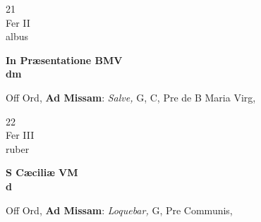 \documentclass[10pt, openany]{book}
\begin{document}
        \begin{center}
            \begin{minipage}{3.5in}
                \vspace{2em}
                \begin{minipage}{0.5in}
                    {\Huge 21} \\
                    {\normalsize Fer II} \\
                    {\normalsize albus}
                \end{minipage}
                \begin{minipage}{3.0in}
                    \textbf{ \large In Præsentatione BMV \\
                    \textnormal{\normalsize dm}} \\ 
                \end{minipage}
                \begin{justify}Off Ord, \textbf{Ad Missam}: \textit{Salve,} G, C, Pre de B Maria Virg,   
                \end{justify}
            \end{minipage}
        \end{center}
    
        \begin{center}
            \begin{minipage}{3.5in}
                \vspace{2em}
                \begin{minipage}{0.5in}
                    {\Huge 22} \\
                    {\normalsize Fer III} \\
                    {\normalsize ruber}
                \end{minipage}
                \begin{minipage}{3.0in}
                    \textbf{ \large S Cæciliæ VM \\
                    \textnormal{\normalsize d}} \\ 
                \end{minipage}
                \begin{justify}Off Ord, \textbf{Ad Missam}: \textit{Loquebar,} G, Pre Communis,   
                \end{justify}
            \end{minipage}
        \end{center}
    
\end{document}
